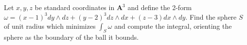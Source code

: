 Let $x,y,z$ be standard coordinates in $\mathbf{A}^3$ and define the
2-form $\omega=(x-1)^3 dy \wedge dz+ (y-2)^3 dz \wedge dx + (z-3)dx
\wedge dy$. Find the sphere $S$ of unit radius which minimizes
$\int_{S}\omega$ and compute the integral, orienting the sphere as the
boundary of the ball it bounds.

